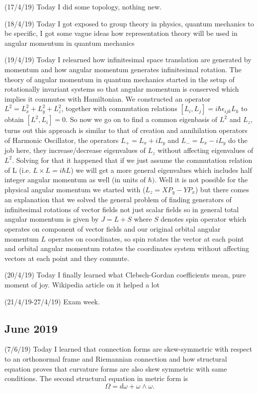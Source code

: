 \documentclass[12pt,a4paper]{article}
\begin{document}
(17/4/19) Today I did some topology, nothing new.

(18/4/19) Today I got exposed to group theory in physics, quantum mechanics to be specific, I got some vague ideas how representation theory will be used in angular momentum in quantum mechanics

(19/4/19) Today I relearned how infinitesimal space translation are generated by momentum and how angular momentum generates infinitesimal rotation. The theory of angular momentum in quantum mechanics started in the setup of rotationally invariant systems so that angular momentum is conserved which implies it commutes with Hamiltonian. We constructed an operator $L^2=L_x^2+L_y^2+L_z^2$, together with commutation relations $[L_i,L_j]=i\hbar\epsilon_{ijk}L_k$ to obtain $[L^2,L_i]=0$. So now we go on to find a common eigenbasis of $L^2$ and $L_z$, turns out this approach is similar to that of creation and annihilation operators of Harmonic Oscillator, the operators $L_+=L_x+iL_y$ and $L_-=L_x-iL_y$ do the job here, they increase/decrease eigenvalues of $L_z$ without affecting eigenvalues of $L^2$. Solving for that it happened that if we just assume the commutation relation of L (i.e. $L\times L=i\hbar L$) we will get a more general eigenvalues which includes half integer angular momentum as well (in units of $\hbar)$. Well it is not possible for the physical angular momentum we started with ($L_z=XP_y-YP_x$) but there comes an explanation that we solved the general problem of finding generators of infinitesimal rotations of vector fields not just scalar fields so in general total angular momentum is given by $J=L+S$ where $S$ denotes spin operator which operates on component of vector fields and our original orbital angular momentum $L$ operates on coordinates, so spin rotates the vector at each point and orbital angular momentum rotates the coordinates system without affecting vectors at each point and they commute.

(20/4/19) Today I finally learned what Clebsch-Gordan coefficients mean, pure moment of joy. Wikipedia article on it helped a lot

(21/4/19-27/4/19) Exam week. 

\subsection*{June 2019} 

\quad(7/6/19) Today I learned that connection forms are skew-symmetric with respect to an orthonormal frame and Riemannian connection and how structural equation proves that curvature forms are also skew symmetric with same conditions.
The second structural equation in metric form is $$\Omega =d\omega+\omega\wedge \omega.$$
\end{document}
